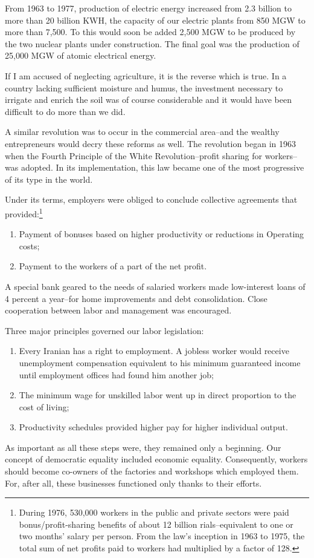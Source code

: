 From 1963 to 1977, production of electric energy increased from 2.3 billion to more than 20 billion KWH, the capacity of our electric plants from 850 MGW to more than 7,500. To this would soon be added 2,500 MGW to be produced by the two nuclear plants under construction. The final goal was the production of 25,000 MGW of atomic electrical energy. 

If I am accused of neglecting agriculture, it is the reverse which is true. In a country lacking sufficient moisture and humus, the investment necessary to irrigate and enrich the soil was of course considerable and it would have been difficult to do more than we did. 


A similar revolution was to occur in the commercial area--and the wealthy entrepreneurs would decry these reforms as well. The revolution began in 1963 when the Fourth Principle of the White Revolution--profit sharing for workers--was adopted. In its implementation, this law became one of the most progressive of its type in the world. 

Under its terms, employers were obliged to conclude collective agreements that provided:\footnote{During 1976, 530,000 workers in the public and private sectors were paid bonus/profit-sharing benefits of about 12 billion rials--equivalent to one or two months’ salary per person. From the law's inception in 1963 to 1975, the total sum of net profits paid to workers had multiplied by a factor of 128.}
\begin{enumerate}
\item Payment of bonuses based on higher productivity or reductions in Operating costs; 

\item Payment to the workers of a part of the net profit. 
\end{enumerate}
A special bank geared to the needs of salaried workers made low-interest loans of 4 percent a year--for home improvements and debt consolidation. Close cooperation between labor and management was encouraged. 

Three major principles governed our labor legislation: 
\begin{enumerate}
\item Every Iranian has a right to employment. A jobless worker would receive unemployment compensation equivalent to his minimum guaranteed income until employment offices had found him another job; 

\item The minimum wage for unskilled labor went up in direct proportion to the cost of living; 

\item Productivity schedules provided higher pay for higher individual output. 
\end{enumerate}
As important as all these steps were, they remained only a beginning. Our concept of democratic equality included economic equality. Consequently, workers should become co-owners of the factories and workshops which employed them. For, after all, these businesses functioned only thanks to their efforts. 

